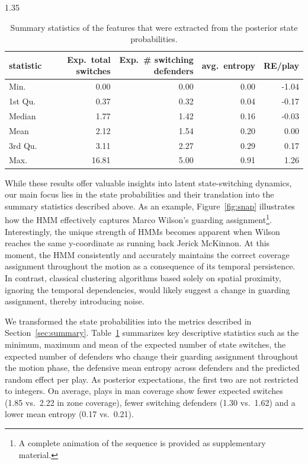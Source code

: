 \documentclass[12pt,a4paper]{article}
\begin{document}
\begin{spacing}{1.35}
\begin{table}[!t]
\caption{Summary statistics of the features that were extracted from the posterior state probabilities.}
\label{tab:state_decod}
\centering
\begin{tabular}[t]{lrrrr}
\hline
statistic & Exp.\ total switches & Exp.\ \# switching defenders & avg.\ entropy & RE/play\\
\hline
Min. & 0.00 & 0.00 & 0.00 & -1.04\\
1st Qu. & 0.37 & 0.32 & 0.04 & -0.17\\
Median & 1.77 & 1.42 & 0.16 & -0.03\\
Mean & 2.12 & 1.54 & 0.20 & 0.00\\
3rd Qu. & 3.11 & 2.27 & 0.29 & 0.17\\
Max. & 16.81 & 5.00 & 0.91 & 1.26\\
\hline
\end{tabular}
\end{table}

While these results offer valuable insights into latent state-switching dynamics, our main focus lies in the state probabilities and their translation into the summary statistics described above. As an example, Figure~\ref{fig:snap} illustrates how the HMM effectively captures Marco Wilson's guarding assignment\footnote{A complete animation of the sequence is provided as supplementary material.}. Interestingly, the unique strength of HMMs becomes apparent when Wilson reaches the same $\mathrm{y}$-coordinate as running back Jerick McKinnon. At this moment, the HMM consistently and accurately maintains the correct coverage assignment throughout the motion as a consequence of its temporal persistence. In contrast, classical clustering algorithms based solely on spatial proximity, ignoring the temporal dependencies, would likely suggest a change in guarding assignment, thereby introducing noise. 

We transformed the state probabilities into the metrics described in Section~\ref{sec:summary}. Table~\ref{tab:state_decod} summarizes key descriptive statistics such as the minimum, maximum and mean of the expected number of state switches, the expected number of defenders who change their guarding assignment throughout the motion phase, the defensive mean entropy across defenders and the predicted random effect per play. As posterior expectations, the first two are not restricted to integers. On average, plays in man coverage show fewer expected switches (1.85 vs.\ 2.22 in zone coverage), fewer switching defenders (1.30 vs.\ 1.62) and a lower mean entropy (0.17 vs.\ 0.21).


\end{spacing}
\end{document}
